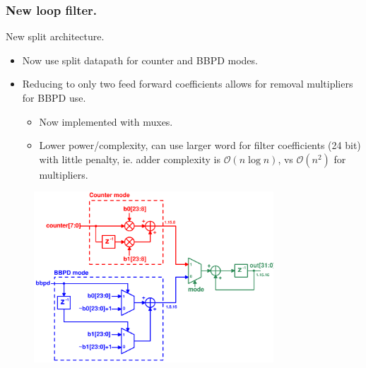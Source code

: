 \documentclass[t, screen, aspectratio=43]{beamer}
\begin{document}
\begin{frame}
	\frametitle{New loop filter.}
	\begin{block}{New split architecture.}
		\begin{minipage}{4cm}
			\vspace{1em}
			\tiny

			\begin{itemize}[itemsep=4pt,label=\protect---]
				\item Now use split datapath for counter and BBPD modes.
				\item Reducing to only two feed forward coefficients allows for removal multipliers for BBPD use.
				\begin{itemize}[itemsep=4pt,label=\protect$\bullet$]
						\item Now implemented with muxes.
						\item Lower power/complexity, can use larger word for filter coefficients (24 bit) with little penalty, ie. adder complexity is $\mathcal{O}(n\log n)$, vs $\mathcal{O}(n^2)$ for multipliers.
				\end{itemize} 
			\end{itemize}

		\end{minipage}%
		\begin{minipage}{8cm}
			\begin{figure}[htb!]
			        \centering
			        \includegraphics[width=0.8\textwidth, angle=0]{mux_datapath}
			\end{figure}
		\end{minipage}%

	\end{block}	
\end{frame}
\end{document}
